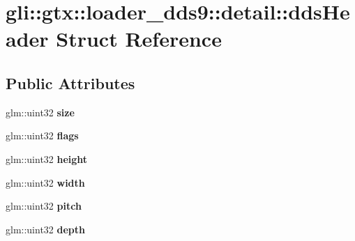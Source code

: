 \hypertarget{structgli_1_1gtx_1_1loader__dds9_1_1detail_1_1ddsHeader}{\section{gli\-:\-:gtx\-:\-:loader\-\_\-dds9\-:\-:detail\-:\-:dds\-Header \-Struct \-Reference}
\label{structgli_1_1gtx_1_1loader__dds9_1_1detail_1_1ddsHeader}
}
\subsection*{\-Public \-Attributes}
\begin{DoxyCompactItemize}
\item 
\hypertarget{structgli_1_1gtx_1_1loader__dds9_1_1detail_1_1ddsHeader_af547879c816313f2c050a464d4a76765}{glm\-::uint32 {\bfseries size}}\label{structgli_1_1gtx_1_1loader__dds9_1_1detail_1_1ddsHeader_af547879c816313f2c050a464d4a76765}

\item 
\hypertarget{structgli_1_1gtx_1_1loader__dds9_1_1detail_1_1ddsHeader_a62ea3ccceddda3c0ea2f26c2e1816f17}{glm\-::uint32 {\bfseries flags}}\label{structgli_1_1gtx_1_1loader__dds9_1_1detail_1_1ddsHeader_a62ea3ccceddda3c0ea2f26c2e1816f17}

\item 
\hypertarget{structgli_1_1gtx_1_1loader__dds9_1_1detail_1_1ddsHeader_a3c55818f33731e3d0130b76f038c157b}{glm\-::uint32 {\bfseries height}}\label{structgli_1_1gtx_1_1loader__dds9_1_1detail_1_1ddsHeader_a3c55818f33731e3d0130b76f038c157b}

\item 
\hypertarget{structgli_1_1gtx_1_1loader__dds9_1_1detail_1_1ddsHeader_a90d30e743be0c138fe58a51c89eac588}{glm\-::uint32 {\bfseries width}}\label{structgli_1_1gtx_1_1loader__dds9_1_1detail_1_1ddsHeader_a90d30e743be0c138fe58a51c89eac588}

\item 
\hypertarget{structgli_1_1gtx_1_1loader__dds9_1_1detail_1_1ddsHeader_a32718281b77bf343e51cad6831afeaa7}{glm\-::uint32 {\bfseries pitch}}\label{structgli_1_1gtx_1_1loader__dds9_1_1detail_1_1ddsHeader_a32718281b77bf343e51cad6831afeaa7}

\item 
\hypertarget{structgli_1_1gtx_1_1loader__dds9_1_1detail_1_1ddsHeader_ae16490cf5200f64323e364fb0156d2d9}{glm\-::uint32 {\bfseries depth}}\label{structgli_1_1gtx_1_1loader__dds9_1_1detail_1_1ddsHeader_ae16490cf5200f64323e364fb0156d2d9}


\end{DoxyCompactItemize}
